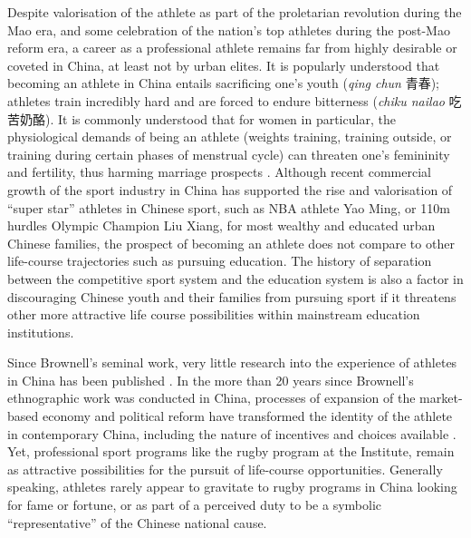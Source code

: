 \begin{CJK}{UTF8}{gbsn}
 Despite valorisation of the athlete as part of the proletarian revolution during the Mao era, and some celebration of the nation's top athletes during the post-Mao reform era, a career as a professional athlete remains far from highly desirable or coveted in China, at least not by urban elites.  It is popularly understood that becoming an athlete in China entails sacrificing one's youth (\textit{qing chun} 青春); athletes train incredibly hard and are forced to endure bitterness (\textit{chiku nailao} 吃苦奶酪). It is commonly understood that for women in particular, the physiological demands of being an athlete (weights training, training outside, or training during certain phases of menstrual cycle) can threaten one's femininity and fertility, thus harming marriage prospects \citep{Brownell1995}.  Although recent commercial growth of the sport industry in China has supported the rise and valorisation of ``super star'' athletes in Chinese sport, such as NBA athlete Yao Ming, or 110m hurdles Olympic Champion Liu Xiang, for most wealthy and educated urban Chinese families, the prospect of becoming an athlete does not compare to other life-course trajectories such as pursuing education.  The history of separation between the competitive sport system and the education system is also a factor in discouraging Chinese youth and their families from pursuing sport if it threatens other more attractive life course possibilities within mainstream education institutions.

 Since Brownell's seminal work, very little research into the experience of athletes in China has been published \citep[but see][]{Brownell2000,Brownell2008}.  In the more than 20 years since Brownell's ethnographic work was conducted in China, processes of expansion of the market-based economy and political reform have transformed the identity of the athlete in contemporary China, including the nature of incentives and choices available \citep{Taylor2010}.  Yet, professional sport programs like the rugby program at the Institute, remain as attractive possibilities for the pursuit of life-course opportunities.  Generally speaking, athletes rarely appear to gravitate to rugby programs in China looking for fame or fortune, or as part of a perceived duty to be a symbolic ``representative'' of the Chinese national cause.



\end{CJK}
